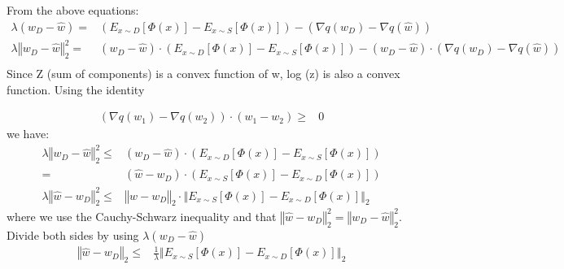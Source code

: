 \documentclass{article}
\begin{document}
\begin{description}
    From the above equations:
    \begin{align*}
      \lambda\left(w_{D}-\hat{w}\right) = & \left(E_{x\sim D}\left[\Phi\left(x\right)\right]-E_{x\sim S}\left[\Phi\left(x\right)\right]\right)-\left(\nabla q(w_{D})-\nabla q(\hat{w})\right) \\
      \lambda\left\Vert w_{D}-\hat{w}\right\Vert _{2}^{2}= &\left(w_{D}-\hat{w}\right)\cdot\left(E_{x\sim D}\left[\Phi\left(x\right)\right]-E_{x\sim S}\left[\Phi\left(x\right)\right]\right)-\left(w_{D}-\hat{w}\right)\cdot\left(\nabla q(w_{D})-\nabla q(\hat{w})\right) \\
    \end{align*}
    Since Z (sum of components) is a convex function of w, log (z) is also a convex function. Using the identity

    \begin{align*}
      \left(\nabla q(w_{1})-\nabla q(w_{2})\right)\cdot\left(w_{1}-w_{2}\right) \geq &  0
    \end{align*}
     we have:
     \begin{align*}
       \lambda\left\Vert w_{D}-\hat{w}\right\Vert _{2}^{2} \leq & \left(w_{D}-\hat{w}\right)\cdot\left(E_{x\sim D}\left[\Phi\left(x\right)\right]-E_{x\sim S}\left[\Phi\left(x\right)\right]\right) \\ 
       = & \left(\hat{w}-w_{D}\right)\cdot\left(E_{x\sim S}\left[\Phi\left(x\right)\right]-E_{x\sim D}\left[\Phi\left(x\right)\right]\right) \\
       \lambda\left\Vert \hat{w}-w_{D}\right\Vert _{2}^{2}\leq & \left\Vert \hat{w}-w_{D}\right\Vert _{2}\cdot\left\Vert E_{x\sim S}\left[\Phi\left(x\right)\right]-E_{x\sim D}\left[\Phi\left(x\right)\right]\right\Vert _{2}
     \end{align*}
      where we use the Cauchy-Schwarz inequality and that $\left\Vert \hat{w}-w_{D}\right\Vert _{2}^{2}=\left\Vert w_{D}-\hat{w}\right\Vert _{2}^{2}$. Divide both sides by using $\lambda\left(w_{D}-\hat{w}\right)$
      \begin{align*}
        \left\Vert \hat{w}-w_{D}\right\Vert _{2} \leq & \frac{1}{\lambda}\left\Vert E_{x\sim S}\left[\Phi\left(x\right)\right]-E_{x\sim D}\left[\Phi\left(x\right)\right]\right\Vert _{2}
      \end{align*}
\end{description}
\end{document}
